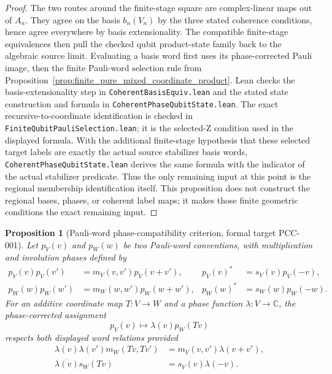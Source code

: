 \documentclass{article}
\newtheorem{proposition}[definition]{Proposition}
\begin{document}
\begin{proof}
The two routes around the finite-stage square are complex-linear maps out of
$A_n$.  They agree on the basis $b_n(V_n)$ by the three stated coherence
conditions, hence agree everywhere by basis extensionality.  The compatible
finite-stage equivalences then pull the checked qubit product-state family
back to the algebraic source limit.  Evaluating a basis word first uses its
phase-corrected Pauli image, then the finite Pauli-word selection rule from
Proposition~\ref{prop:finite_pure_mixed_coordinate_product}.  Lean checks the
basis-extensionality step in \texttt{CoherentBasisEquiv.lean} and the stated
state construction and formula in \texttt{CoherentPhaseQubitState.lean}.
The exact recursive-to-coordinate identification is checked in
\texttt{FiniteQubitPauliSelection.lean}; it is the selected-Z condition used
in the displayed formula.
With the additional finite-stage hypothesis that these selected target labels
are exactly the actual source stabilizer basis words,
\texttt{CoherentPhaseQubitState.lean} derives the same formula with the
indicator of the actual stabilizer predicate.  Thus the only remaining input
at this point is the regional membership identification itself.
This proposition does not construct the regional bases, phases, or coherent
label maps; it makes those finite geometric conditions the exact remaining
input.
\end{proof}

\begin{proposition}[Pauli-word phase-compatibility criterion, formal target
PCC-001]
\label{prop:pauli_cocycle_compatibility}
Let $p_V(v)$ and $p_W(w)$ be two Pauli-word conventions, with multiplication
and involution phases defined by
\begin{align*}
  p_V(v)p_V(v')&=m_V(v,v')p_V(v+v'),
  &p_V(v)^*&=s_V(v)p_V(-v),\\
  p_W(w)p_W(w')&=m_W(w,w')p_W(w+w'),
  &p_W(w)^*&=s_W(w)p_W(-w).
\end{align*}
For an additive coordinate map $T:V\to W$ and a phase function
$\lambda:V\to\mathbb C$, the phase-corrected assignment
\begin{equation*}
  p_V(v)\longmapsto \lambda(v)p_W(Tv)
\end{equation*}
respects both displayed word relations provided
\begin{align*}
  \lambda(v)\lambda(v')m_W(Tv,Tv')
    &=m_V(v,v')\lambda(v+v'),\\
  \overline{\lambda(v)}s_W(Tv)
    &=s_V(v)\lambda(-v).
\end{align*}
\end{proposition}
\end{document}
